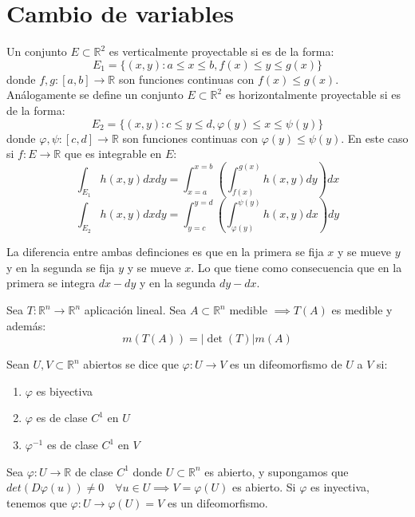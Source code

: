 \section{Cambio de variables}

\begin{definición} 
Un conjunto $E \subset \mathbb{R}^2$ es verticalmente proyectable si es de la forma:
$$E_1 = \{(x,y) : a \leq x \leq b, f(x) \leq y \leq g(x)\}$$ donde $f,g : [a,b] \to \mathbb{R}$ son funciones continuas con $f(x) \leq g(x)$.
Análogamente se define un conjunto $E \subset \mathbb{R}^2$ es horizontalmente proyectable si es de la forma:
$$E_2 = \{ (x,y) : c \leq y \leq d, \varphi(y) \leq x \leq \psi(y)\}$$
donde $\varphi, \psi : [c,d] \to \mathbb{R}$ son funciones continuas con $\varphi(y) \leq \psi(y)$.
En este caso si $f: E \to \mathbb{R}$ que es integrable en $E$:
$$\int_{E_1}h(x,y)dxdy = \int_{x = a}^{x = b}\left(\int_{f(x)}^{g(x)}h(x,y)dy\right)dx$$
$$\int_{E_2}h(x,y)dxdy = \int_{y = c}^{y = d}\left(\int_{\varphi(y)}^{\psi(y)}h(x,y)dx\right)dy$$

\end{definición}

\begin{observación}
La diferencia entre ambas definciones es que en la primera se fija $x$ y se mueve $y$ y en la segunda se fija $y$ y se mueve $x$. Lo que tiene como consecuencia que en la primera se integra $dx-dy$ y en la segunda $dy-dx$.
\end{observación}

\begin{teorema}
    Sea $T: \mathbb{R}^n \to \mathbb{R}^n$ aplicación lineal. Sea $A \subset \mathbb{R}^n$ medible $\implies T(A)$ es medible y además:
    \[m(T(A)) = |\det(T)|m(A)\]
\end{teorema}
\begin{definición} 
Sean $U, V \subset \mathbb{R}^n$ abiertos se dice que $\varphi: U \to V$ es un difeomorfismo de $U$ a $V$ si:
\vspace{-0.5em}
\begin{enumerate}
    \item $\varphi$ es biyectiva
    \item $\varphi$ es de clase $C^1$ en $U$
    \item $\varphi^{-1}$ es de clase $C^1$ en $V$
\end{enumerate}
\end{definición}
\begin{observación}
Sea $\varphi: U \to \mathbb{R}$ de clase $C^1$ donde $U \subset \mathbb{R}^n$ es abierto, y supongamos que $det(D\varphi(u)) \neq 0 \quad \forall u \in U \implies V = \varphi(U)$ es abierto. Si $\varphi$ es inyectiva, tenemos que $\varphi: U \to \varphi(U) = V$ es un difeomorfismo.
\end{observación}

